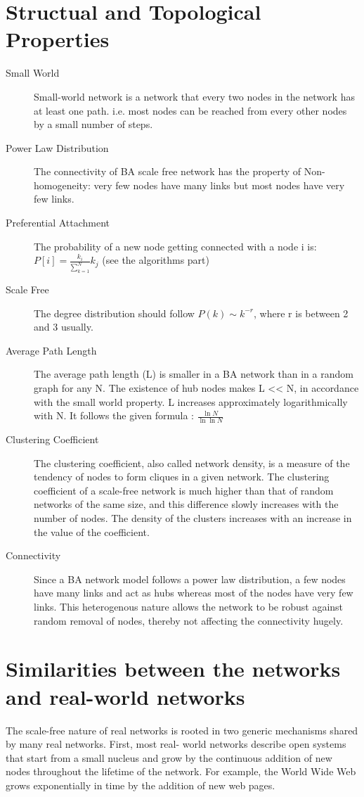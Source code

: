 \documentclass[a0,final]{a0poster}
\begin{document}
\begin{multicols}{3}
\section*{Structual and Topological Properties}

\begin{description} 
\item[Small World] Small-world network is a network that every two nodes in the network has at least one path. i.e. most nodes can be reached from every other nodes by a small number of steps. 
  \item[Power Law Distribution] The connectivity of BA scale free network has the property of Non-homogeneity: very few nodes have many links but most nodes have very few links.
  \item[Preferential Attachment] The probability of a new node getting connected with a node i is: $P[i] = \frac{k_i}{\sum\limits_{k=1}^N} k_j$ (see the algorithms part)


  \item[Scale Free] The degree distribution should follow $P(k) \sim k^{-r}$, where r is between 2 and 3 usually.
\item[Average Path Length] The average path length (L) is smaller in a BA network than in a random graph for any N. The existence of hub nodes makes L << N, in accordance with the small world property. L increases approximately logarithmically with N. It follows the given formula :  $\frac{\ln{N}}{\ln{\ln{N}}}$

\item[Clustering Coefficient] The clustering coefficient, also called network density, is a measure of the tendency of nodes to form cliques in a given network. The clustering coefficient of a scale-free network is much higher than that of random networks of the same size, and this difference slowly increases with the number of nodes. The density of the clusters increases with an increase in the value of the coefficient.

\item[Connectivity] Since a BA network model follows a power law distribution, a few nodes have many links and act as hubs whereas most of the nodes have very few links. This heterogenous nature allows the network to be robust against random removal of nodes, thereby not affecting the connectivity hugely.

\end{description}

\section*{Similarities between the networks and real-world networks}
The scale-free nature of real networks is rooted in two generic mechanisms shared by many real networks. First, most real- world networks describe open systems that start from a small nucleus and grow by the continuous addition of new nodes throughout the lifetime of the network. For example, the World Wide Web grows exponentially in time by the addition of new web pages.
			

\end{multicols}
\end{document}
